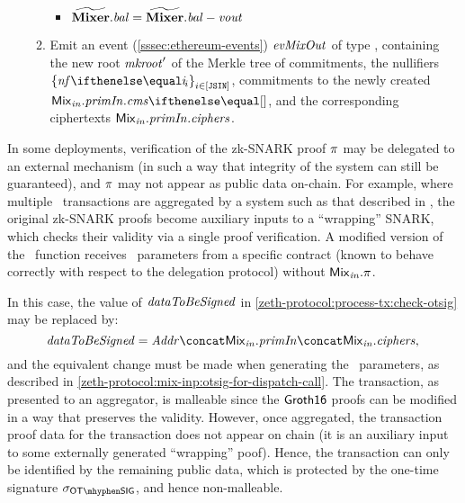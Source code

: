 \begin{enumerate}
\begin{enumerate}
\begin{itemize}
                    \item $\widetilde{\mathbf{Mixer}}.\mathit{bal} = \widetilde{\mathbf{Mixer}}.\mathit{bal} - \mathit{vout}$
                \end{itemize}
            \item Emit an event (\cref{sssec:ethereum-events}) $\mathit{evMixOut}$ of type \mixEventDType, containing the new root $\mathit{mkroot}'$ of the Merkle tree of commitments, the nullifiers $\indexedset{\nf{i}}{i \in [\jsin]}$, commitments to the newly created \zethnotes $\inp{\mix}.\primInp.\cms{}$, and the corresponding ciphertexts $\mathit{{\mathsf{Mix}}_{in}}.\mathit{primIn}.\mathit{ciphers}$.
        \end{enumerate}
\end{enumerate}

\begin{remark}\label{zeth-protocol:process-tx:dispatch-call}
  In some deployments, verification of the zk-SNARK proof $\mathit{\pi}$ may be delegated to an external mechanism (in such a way that integrity of the system can still be guaranteed), and $\mathit{\pi}$ may not appear as public data on-chain. For example, where multiple \zeth~transactions are aggregated by a system such as that described in \cite{rondelet2020zecale}, the original zk-SNARK proofs become auxiliary inputs to a ``wrapping'' SNARK, which checks their validity via a single proof verification. A modified version of the \mix~function receives \mix~parameters from a specific contract (known to behave correctly with respect to the delegation protocol) without $\mathit{{\mathsf{Mix}}_{in}}.\mathit{\pi}$.

  In this case, the value of $\mathit{dataToBeSigned}$ in \cref{zeth-protocol:process-tx:check-otsig} may be replaced by:
  \[
  \datatobesigned = \addr \concat \inp{\mix}.\primInp \concat \inp{\mix}.\ciphers, \\
  \]
  and the equivalent change must be made when generating the \mix~parameters, as described in \cref{zeth-protocol:mix-inp:otsig-for-dispatch-call}. The transaction, as presented to an aggregator, is malleable since the $\mathsf{Groth16}$ proofs can be modified in a way that preserves the validity. However, once aggregated, the transaction proof data for the transaction does not appear on chain (it is an auxiliary input to some externally generated ``wrapping'' poof). Hence, the transaction can only be identified by the remaining public data, which is protected by the one-time signature $\otsSigma$, and hence non-malleable.


\end{remark}
